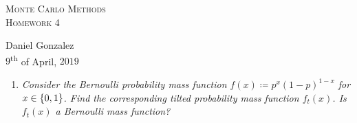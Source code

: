\documentclass[11pt, a4paper]{article}
\newcommand{\defn}{\coloneqq}
\DeclarePairedDelimiter \set{\lbrace}{\rbrace}
\begin{document}
\begin{center}
    \textsc{\huge Monte Carlo Methods}\\
    \textsc{\Large Homework 4}\\
\end{center}
\begin{flushright}
    Daniel Gonzalez\\
    $9$\textsuperscript{th} of April, $2019$
\end{flushright}

\begin{enumerate}
    \item \label{1}
        {\it Consider the Bernoulli probability mass function $f(x) \defn p^x(1 - p)^{1 - x}$ for $x \in \set*{0, 1}$.
        Find the corresponding tilted probability mass function $f_t(x)$.
        Is $f_t(x)$ a Bernoulli mass function?}


\end{enumerate}
\end{document}
